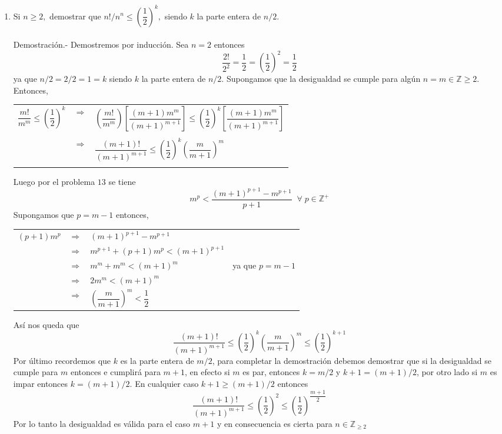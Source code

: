 \begin{enumerate}[ \bfseries 1.]
\item Si $n \geq 2,$ demostrar que $n!/n^n \leq \left( \dfrac{1}{2} \right)^k,$ siendo $k$ la parte entera de $n/2.$\\\\
Demostración.- \; Demostremos por inducción. Sea $n=2$ entonces $$\dfrac{2!}{2^2} = \dfrac{1}{2} = \left( \dfrac{1}{2} \right)^2 = \dfrac{1}{2}$$ ya que $n/2 = 2/2 = 1 = k$ siendo $k$ la parte entera de $n/2$. Supongamos que la desigualdad se cumple para algún $n=m \in \mathbb{Z} \geq 2$. Entonces,
\begin{center}
\begin{tabular}{rcl}
$\dfrac{m!}{m^m} \leq \left( \dfrac{1}{2} \right)^k$ & $\Rightarrow$ & $\left( \dfrac{m!}{m^m} \right)\left[ \dfrac{(m+1)m^m}{(m+1)^{m+1}} \right] \leq \left( \dfrac{1}{2} \right)^k  \left[ \dfrac{(m+1)m^m}{(m+1)^{m+1}} \right]$\\\\
&$\Rightarrow$&$\dfrac{(m+1)!}{(m+1)^{m+1}} \leq \left( \dfrac{1}{2} \right)^k \left( \dfrac{m}{m+1} \right)^m $\\\\
\end{tabular}
\end{center} 
Luego por el problema $13$ se tiene $$m^p < \dfrac{(m+1)^{p+1} - m^{p+1}}{p+1} \;\; \forall \; p \in \mathbb{Z}^{+}$$
Supongamos que $p=m-1$ entonces,
\begin{center}
\begin{tabular}{rcll}
$(p+1)m^p$&$\Rightarrow$&$(m+1)^{p+1} - m^{p+1}$&\\
&$\Rightarrow$&$m^{p+1} + (p+1)m^p < (m+1)^{p+1}$&\\
&$\Rightarrow$&$m^m + m^m < (m+1)^m$& ya que $p=m-1$\\
&$\Rightarrow$&$2m^m < (m+1)^m$\\
&$\Rightarrow$&$\left( \dfrac{m}{m+1}\right) ^m < \dfrac{1}{2}$\\
\end{tabular}
\end{center}
Así nos queda que $$\dfrac{(m+1)!}{(m+1)^{m+1}} \leq \left( \dfrac{1}{2} \right)^k \left( \dfrac{m}{m+1}\right)^m \leq \left( \dfrac{1}{2} \right)^{k+1}$$
Por último recordemos que $k$ es la parte entera de $m/2$, para completar la demostración debemos demostrar que si la desigualdad se  cumple para $m$ entonces e cumplirá para $m+1$, en efecto si $m$ es par, entonces $k=m/2$ y $k+1 = (m+1)/2$, por otro lado si $m$ es impar entonces $k=(m+1)/2$. En cualquier caso $k+1  \geq (m+1)/2$ entonces $$\dfrac{(m+1)!}{(m+1)^{m+1}} \leq \left(\dfrac{1}{2} \right)^2 \leq \left( \dfrac{1}{2} \right) ^{\dfrac{m+1}{2}}$$
Por lo tanto la desigualdad es válida para el caso $m+1$ y en consecuencia es cierta para $n \in \mathbb{Z}_{\geq 2}$\\\\


\end{enumerate}
